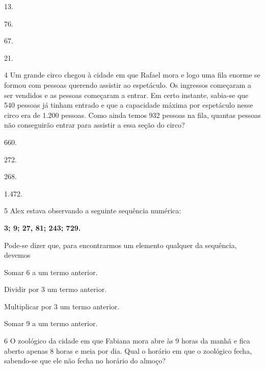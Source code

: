 \begin{multicols}{2}
\begin{escolha}
\item
  13.
\item
  76.
\item
  67.
\item
  21.
\end{escolha}
\end{multicols}

\num{4} Um grande circo chegou à cidade em que Rafael mora e logo uma fila enorme se formou com pessoas querendo assistir ao espetáculo. Os ingressos começaram a ser vendidos e as pessoas começaram a entrar. Em certo instante, sabia-se que 540 pessoas já tinham entrado e que a capacidade máxima por espetáculo nesse circo era de 1.200 pessoas. Como ainda temos 932 pessoas na fila, quantas pessoas não conseguirão entrar para assistir a essa seção do circo?

\begin{multicols}{2}
\begin{escolha}
\item
  660.
\item
  272.
\item
  268.
\item
  1.472.
\end{escolha}
\end{multicols}

\num{5} Alex estava observando a seguinte sequência numérica: 

\begin{myquote}
\centering
\textbf{3; 9; 27, 81; 243; 729.}
\end{myquote}

Pode-se dizer que, para encontrarmos um elemento qualquer da sequência, devemos 

\begin{multicols}{2}
\begin{escolha}
\item
  Somar 6 a um termo anterior.
\item
  Dividir por 3 um termo anterior.
\item
  Multiplicar por 3 um termo anterior.
\item
  Somar 9 a um termo anterior.
\end{escolha}
\end{multicols}

\num{6} O zoológico da cidade em que Fabiana mora abre às 9 horas da manhã e fica aberto apenas 8 horas e meia por dia. Qual o horário em que o zoológico fecha, sabendo-se que ele não fecha no horário do almoço?

